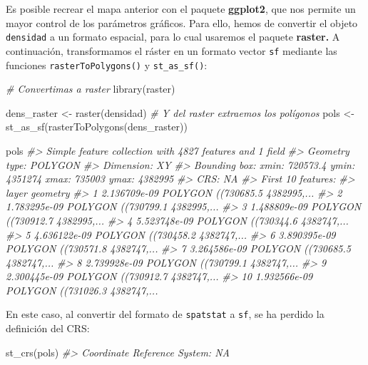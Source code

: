 \documentclass[
]{book}
\newenvironment{Shaded}{\begin{snugshade}}{\end{snugshade}}
\newcommand{\CommentTok}[1]{\textcolor[rgb]{0.56,0.35,0.01}{\textit{#1}}}
\newcommand{\FunctionTok}[1]{\textcolor[rgb]{0.00,0.00,0.00}{#1}}
\newcommand{\NormalTok}[1]{#1}
\newcommand{\OtherTok}[1]{\textcolor[rgb]{0.56,0.35,0.01}{#1}}
\theoremstyle{definition}
\theoremstyle{definition}
\theoremstyle{definition}
\theoremstyle{definition}
\theoremstyle{remark}
\begin{document}
Es posible recrear el mapa anterior con el paquete \textbf{ggplot2}, que nos permite
un mayor control de los parámetros gráficos. Para ello, hemos de convertir el
objeto \texttt{densidad} a un formato espacial, para lo cual usaremos el paquete
\textbf{raster.} A continuación, transformamos el ráster en un formato vector \texttt{sf}
mediante las funciones \texttt{rasterToPolygons()} y \texttt{st\_as\_sf()}:

\begin{Shaded}
\begin{Highlighting}[]
\CommentTok{\# Convertimas a raster}
\FunctionTok{library}\NormalTok{(raster)}

\NormalTok{dens\_raster }\OtherTok{\textless{}{-}} \FunctionTok{raster}\NormalTok{(densidad)}
\CommentTok{\# Y del raster extraemos los polígonos}
\NormalTok{pols }\OtherTok{\textless{}{-}} \FunctionTok{st\_as\_sf}\NormalTok{(}\FunctionTok{rasterToPolygons}\NormalTok{(dens\_raster))}

\NormalTok{pols}
\CommentTok{\#\textgreater{} Simple feature collection with 4827 features and 1 field}
\CommentTok{\#\textgreater{} Geometry type: POLYGON}
\CommentTok{\#\textgreater{} Dimension:     XY}
\CommentTok{\#\textgreater{} Bounding box:  xmin: 720573.4 ymin: 4351274 xmax: 735003 ymax: 4382995}
\CommentTok{\#\textgreater{} CRS:           NA}
\CommentTok{\#\textgreater{} First 10 features:}
\CommentTok{\#\textgreater{}           layer                       geometry}
\CommentTok{\#\textgreater{} 1  2.136709e{-}09 POLYGON ((730685.5 4382995,...}
\CommentTok{\#\textgreater{} 2  1.783295e{-}09 POLYGON ((730799.1 4382995,...}
\CommentTok{\#\textgreater{} 3  1.488809e{-}09 POLYGON ((730912.7 4382995,...}
\CommentTok{\#\textgreater{} 4  5.523748e{-}09 POLYGON ((730344.6 4382747,...}
\CommentTok{\#\textgreater{} 5  4.636122e{-}09 POLYGON ((730458.2 4382747,...}
\CommentTok{\#\textgreater{} 6  3.890395e{-}09 POLYGON ((730571.8 4382747,...}
\CommentTok{\#\textgreater{} 7  3.264586e{-}09 POLYGON ((730685.5 4382747,...}
\CommentTok{\#\textgreater{} 8  2.739928e{-}09 POLYGON ((730799.1 4382747,...}
\CommentTok{\#\textgreater{} 9  2.300445e{-}09 POLYGON ((730912.7 4382747,...}
\CommentTok{\#\textgreater{} 10 1.932566e{-}09 POLYGON ((731026.3 4382747,...}
\end{Highlighting}
\end{Shaded}

En este caso, al convertir del formato de \texttt{spatstat} a \texttt{sf}, se ha perdido la
definición del CRS:

\begin{Shaded}
\begin{Highlighting}[]
\FunctionTok{st\_crs}\NormalTok{(pols)}
\CommentTok{\#\textgreater{} Coordinate Reference System: NA}
\end{Highlighting}
\end{Shaded}
\end{document}
